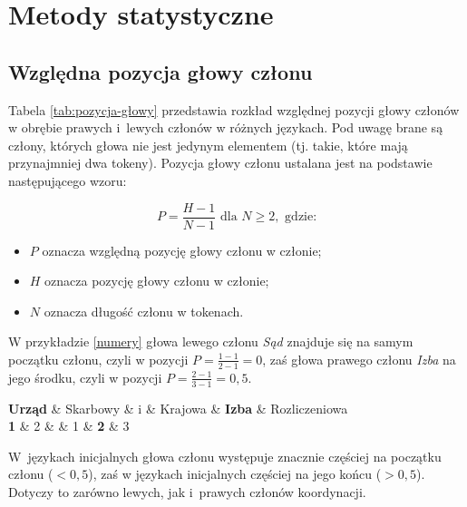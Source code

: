\chapter{Metody statystyczne} \label{ch5}

\section{Względna pozycja głowy członu}



Tabela \ref{tab:pozycja-głowy} przedstawia rozkład względnej pozycji głowy członów w obrębie prawych i~lewych członów w różnych językach. Pod uwagę brane są człony, których głowa nie jest jedynym elementem (tj. takie, które mają przynajmniej dwa tokeny). Pozycja głowy członu ustalana jest na podstawie następującego wzoru:

\[
P = \frac{H-1}{N-1} \text{ dla } N\geq2, \text{ gdzie:}
\]

\begin{itemize}
\item $P$ oznacza względną pozycję głowy członu w członie;
\item $H$ oznacza pozycję głowy członu w członie;
\item $N$ oznacza długość członu w tokenach.
\end{itemize}

W przykładzie \eqref{numery} głowa lewego członu \textit{Sąd} znajduje się na samym początku członu, czyli w pozycji $P=\frac{1-1}{2-1}=0$, zaś głowa prawego członu \textit{Izba} na jego środku, czyli w pozycji $P=\frac{2-1}{3-1}=0,5$.

\begin{exe}
\ex \label{numery}
\begin{dependency}[theme=simple, baseline=0.5ex]
\begin{deptext}
\textbf{Urząd} \& Skarbowy \& i \& Krajowa \& \textbf{Izba} \&  Rozliczeniowa \\
\scriptsize \textbf{1} \& \scriptsize 2 \&   \& \scriptsize 1 \& \scriptsize \textbf{2} \& \scriptsize 3 \\
\end{deptext}
\end{dependency}
\end{exe}

W~językach inicjalnych głowa członu występuje znacznie częściej na początku członu ($<0,5$), zaś w językach inicjalnych częściej na jego końcu ($>0,5$). Dotyczy to zarówno lewych, jak i~prawych członów koordynacji.

